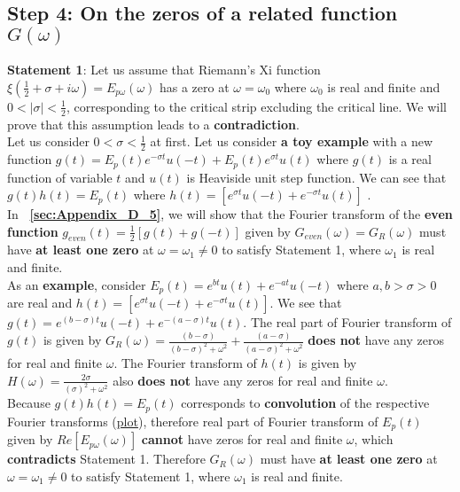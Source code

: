 \documentclass[11pt]{elsarticle}
\begin{document}
\subsection{\label{sec:level2} \textbf{Step 4: On the zeros of a related function $G(\omega)$ } \protect\\  \lowercase{} }



\textbf{Statement 1}: Let us assume that Riemann's Xi function $\xi(\frac{1}{2} + \sigma + i \omega)= E_{p\omega}(\omega)$ has a zero at $\omega = \omega_{0}$ where $\omega_{0}$ is real and finite and $0 < |\sigma| < \frac{1}{2}$, corresponding to the critical strip excluding the critical line.  We will prove that this assumption leads to a \textbf{contradiction}. \\


Let us consider $0 < \sigma < \frac{1}{2}$ at first. Let us consider \textbf{a toy example} with a new function  $g(t) = E_p(t) e^{-\sigma t}  u(-t) + E_p(t) e^{\sigma t}  u(t)  $ where $g(t)$ is a real function of variable $t$ and $u(t)$ is Heaviside unit step function. We can see that $g(t) h(t) = E_p(t)$ where $h(t)=[ e^{ \sigma t} u(-t) + e^{ -  \sigma t} u(t) ]$ . \\

In \textbf{~\ref{sec:Appendix_D_5}}, we will show that the Fourier transform of the \textbf{even function} $g_{even}(t)=\frac{1}{2} [g(t)+g(-t) ] $ given by $G_{even}(\omega) =  G_R(\omega)$  must have \textbf{at least one zero} at $\omega = \omega_{1} \neq 0$ to satisfy Statement 1, where $\omega_1$ is real and finite.\\


As an \textbf{example}, consider $E_p(t)= e^{b t} u(t) + e^{-a t} u(-t)$ where $a, b > \sigma >0$ are real and $h(t) = [ e^{\sigma t} u(-t) + e^{-\sigma t} u(t) ] $. We see that $g(t)= e^{ (b-\sigma) t} u(-t) + e^{ -(a - \sigma) t} u(t)$. The real part of Fourier transform of $g(t)$ is given by $G_R(\omega)=\frac{(b-\sigma)}{(b-\sigma)^{2} + \omega^{2} } + \frac{(a - \sigma)}{(a - \sigma)^{2} +  \omega^{2}}$
\textbf{does not} have any zeros for real and finite $\omega$. The Fourier transform of $h(t)$ is given by $H(\omega)=\frac{2\sigma}{(\sigma)^{2} + \omega^{2} }$ also \textbf{does not} have any zeros for real and finite $\omega$.\\

Because $g(t) h(t) = E_p(t)$ corresponds to \textbf{convolution} of the respective Fourier transforms (\href{https://www.ocf.berkeley.edu/~araman/files/math_z/g_h_E_plots.png}{plot}), therefore real part of Fourier transform of $E_p(t)$ given by $Re[E_{p\omega}(\omega)]$ \textbf{cannot} have zeros for real and finite $\omega$, which \textbf{contradicts} Statement 1. Therefore $G_R(\omega)$  must have \textbf{at least one zero} at $\omega = \omega_{1} \neq 0$ to satisfy Statement 1, where $\omega_1$ is real and finite.\\
\end{document}
